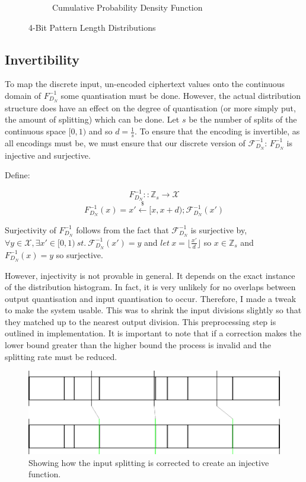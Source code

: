 \documentclass[ %
                    author={Samuel Russell},
                supervisor={Prof. Bogdan Warinschi},
                    degree={MEng},
                     title={Innocuous Ciphertexts},
                  subtitle={The DE-CENSOR Scheme},
                      type={research},
                      year={2018} ]{dissertation}
\begin{document}
\begin{figure}[h]
\begin{subfigure}[b]{.49\linewidth}
\begin{tikzpicture}
\end{tikzpicture}
\caption{Cumulative Probability Density Function}
\label{fig:cum_dist_pat4}
\end{subfigure}
\caption{4-Bit Pattern Length Distributions}
\label{fig:cum_conv}
\end{figure}



\subsection{Invertibility}\label{invertibility}

To map the discrete input, un-encoded ciphertext values onto the continuous domain of $F^{-1}_{D_N}$ some quantisation must be done.
However, the actual distribution structure does have an effect on the degree of quantisation (or more simply put, the amount of splitting) which can be done.
Let $s$ be the number of splits of the continuous space $[0,1)$ and so $d = \frac{1}{s}$.
To ensure that the encoding is invertible, as all encodings must be, we must ensure that our discrete version of $\mathcal{F}^{-1}_{D_N}$: $F^{-1}_{D_N}$ is injective and surjective.

Define:

$$F^{-1}_{D_N} :: \mathbb{Z}_s \rightarrow \mathcal{X}$$
$$F^{-1}_{D_N}(x) = x' \xleftarrow{\$} [x, x+d); \mathcal{F}^{-1}_{D_N}(x')$$

Surjectivity of $F^{-1}_{D_N}$ follows from the fact that $\mathcal{F}^{-1}_{D_N}$ is surjective by, $\forall y \in \mathcal{X}, \exists x' \in [0,1)\ st.\ \mathcal{F}^{-1}_{D_N}(x') = y$ and $ let\ x = \lfloor \frac{x'}{d} \rfloor$ so $x \in \mathbb{Z}_s$ and $F^{-1}_{D_N}(x) = y$ so surjective.

However, injectivity is not provable in general. It depends on the exact instance of the distribution histogram.
In fact, it is very unlikely for no overlaps between output quantisation and input quantisation to occur.
Therefore, I made a tweak to make the system usable.
This was to shrink the input divisions slightly so that they matched up to the nearest output division.
This preprocessing step is outlined in implementation.
It is important to note that if a correction makes the lower bound greater than the higher bound the process is invalid and the splitting rate must be reduced.

\begin{figure}[h]
\centering
\includegraphics[scale=.9]{correction}
\caption{Showing how the input splitting is corrected to create an injective function.}
\label{correction}
\end{figure}
\end{document}

